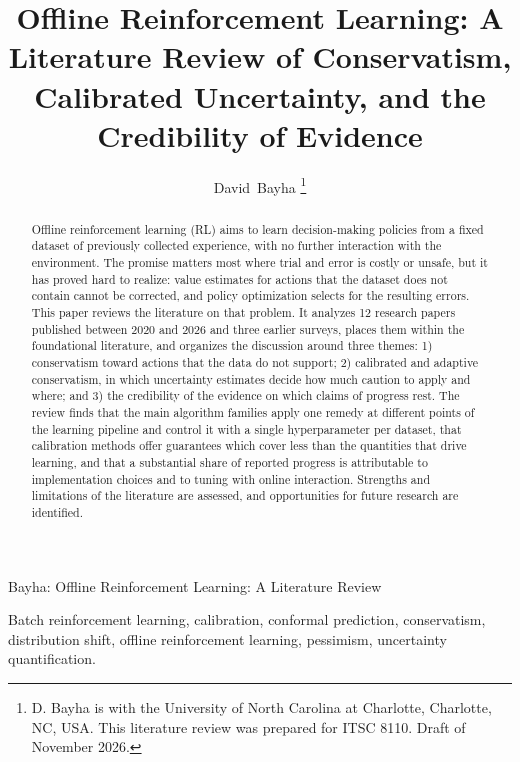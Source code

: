 \documentclass[journal]{IEEEtran}
\begin{document}
\title{Offline Reinforcement Learning: A Literature Review of Conservatism, Calibrated Uncertainty, and the Credibility of Evidence}

\author{David~Bayha%
\thanks{D. Bayha is with the University of North Carolina at Charlotte, Charlotte, NC, USA. This literature review was prepared for ITSC 8110. Draft of November 2026.}}

%
{Bayha: Offline Reinforcement Learning: A Literature Review}

\maketitle

\begin{abstract}
Offline reinforcement learning (RL) aims to learn decision-making policies from a fixed dataset of previously collected experience, with no further interaction with the environment. The promise matters most where trial and error is costly or unsafe, but it has proved hard to realize: value estimates for actions that the dataset does not contain cannot be corrected, and policy optimization selects for the resulting errors. This paper reviews the literature on that problem. It analyzes 12 research papers published between 2020 and 2026 and three earlier surveys, places them within the foundational literature, and organizes the discussion around three themes: 1) conservatism toward actions that the data do not support; 2) calibrated and adaptive conservatism, in which uncertainty estimates decide how much caution to apply and where; and 3) the credibility of the evidence on which claims of progress rest. The review finds that the main algorithm families apply one remedy at different points of the learning pipeline and control it with a single hyperparameter per dataset, that calibration methods offer guarantees which cover less than the quantities that drive learning, and that a substantial share of reported progress is attributable to implementation choices and to tuning with online interaction. Strengths and limitations of the literature are assessed, and opportunities for future research are identified.
\end{abstract}

\begin{IEEEkeywords}
Batch reinforcement learning, calibration, conformal prediction, conservatism, distribution shift, offline reinforcement learning, pessimism, uncertainty quantification.
\end{IEEEkeywords}
\end{document}
